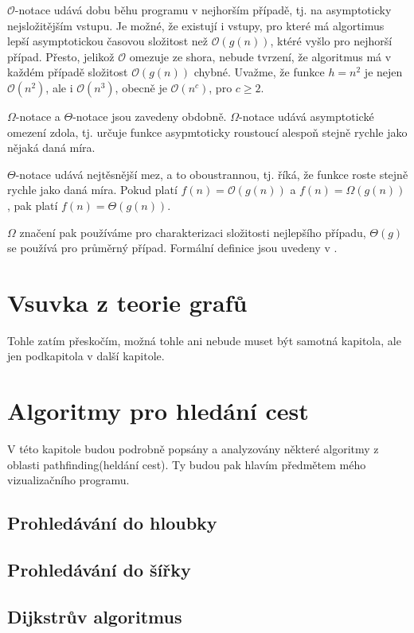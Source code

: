 \documentclass[12pt]{report}			%
\begin{document}
			$\mathcal{O}$-notace udává dobu běhu programu v nejhorším případě, tj. na asymptoticky nejsložitějším vstupu. Je možné, že existují i vstupy, pro které má algortimus lepší asymptotickou časovou složitost než $\mathcal{O}(g(n))$, ktéré vyšlo pro nejhorší případ. Přesto, jelikož $\mathcal{O}$ omezuje ze shora, nebude tvrzení, že algoritmus má v každém případě složitost $\mathcal{O}(g(n))$ chybné. Uvažme, že funkce $h=n^2$ je nejen $\mathcal{O}(n^2)$, ale i $\mathcal{O}(n^3)$, obecně je $\mathcal{O}(n^c)$, pro $c \geq 2$.
			
			$\Omega$-notace a $\Theta$-notace jsou zavedeny obdobně. $\Omega$-notace udává asymptotické omezení zdola, tj. určuje funkce asypmtoticky roustoucí alespoň stejně rychle jako nějaká daná míra.
			
			$\Theta$-notace udává nejtěsnější mez, a to oboustrannou, tj. říká, že funkce roste stejně rychle jako daná míra. Pokud platí 
$f(n) = \mathcal{O}(g(n))$ a $f(n) = \Omega(g(n))$, pak platí $f(n) = \Theta(g(n))$.

			$\Omega$ značení pak používáme pro charakterizaci složitosti nejlepšího případu, $\Theta(g)$ se používá pro průměrný případ.
			Formální definice jsou uvedeny v \cite{intro}.

			

		\chapter{Vsuvka z teorie grafů}
		Tohle zatím přeskočím, možná tohle ani nebude muset být samotná kapitola, ale jen podkapitola v další kapitole.
				
				
		\chapter{Algoritmy pro hledání cest}
		V této kapitole budou podrobně popsány a analyzovány některé algoritmy z oblasti pathfinding(heldání cest). Ty budou pak hlavím předmětem mého vizualizačního programu.
			 
			\section{Prohledávání do hloubky}
			
			\section{Prohledávání do šířky}
			
			\section{Dijkstrův algoritmus}
			
\end{document}
